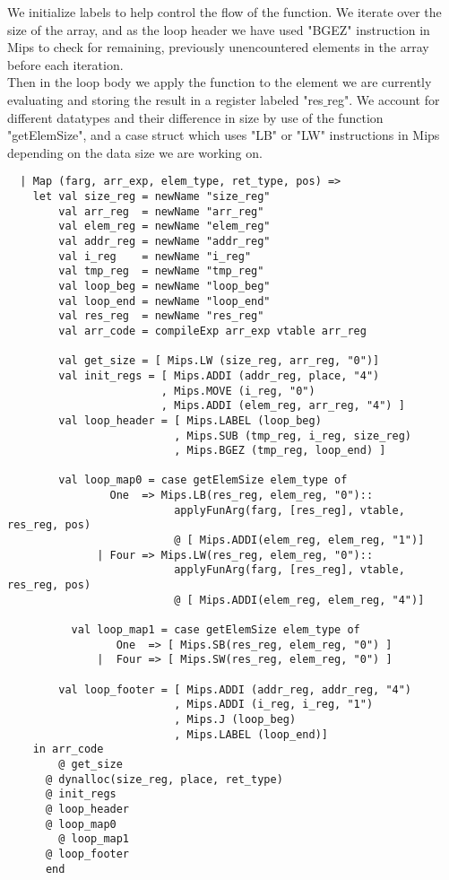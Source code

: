 \documentclass[12pt]{article}
\begin{document}
We initialize labels to help control the flow of the function. We iterate over the size of the array, and as the loop header we have used "BGEZ" instruction in Mips to check for remaining, previously unencountered elements in the array before each iteration. \\

Then in the loop body we apply the function to the element we are currently evaluating and storing the result in a register labeled "res\(\_\)reg". We account for different datatypes and their difference in size by use of the function "getElemSize", and a case struct which uses "LB" or "LW" instructions in Mips depending on the data size we are working on.
\begin{verbatim}
  | Map (farg, arr_exp, elem_type, ret_type, pos) =>
    let val size_reg = newName "size_reg"
        val arr_reg  = newName "arr_reg"
        val elem_reg = newName "elem_reg"
        val addr_reg = newName "addr_reg"
        val i_reg    = newName "i_reg"
        val tmp_reg  = newName "tmp_reg"
        val loop_beg = newName "loop_beg"
        val loop_end = newName "loop_end"
        val res_reg  = newName "res_reg"
        val arr_code = compileExp arr_exp vtable arr_reg

        val get_size = [ Mips.LW (size_reg, arr_reg, "0")]
        val init_regs = [ Mips.ADDI (addr_reg, place, "4")
                        , Mips.MOVE (i_reg, "0")
                        , Mips.ADDI (elem_reg, arr_reg, "4") ]
        val loop_header = [ Mips.LABEL (loop_beg)
                          , Mips.SUB (tmp_reg, i_reg, size_reg)
                          , Mips.BGEZ (tmp_reg, loop_end) ]

        val loop_map0 = case getElemSize elem_type of
			    One  => Mips.LB(res_reg, elem_reg, "0")::
				          applyFunArg(farg, [res_reg], vtable, res_reg, pos)
				          @ [ Mips.ADDI(elem_reg, elem_reg, "1")]
			  | Four => Mips.LW(res_reg, elem_reg, "0")::
				          applyFunArg(farg, [res_reg], vtable, res_reg, pos)
				          @ [ Mips.ADDI(elem_reg, elem_reg, "4")]

	      val loop_map1 = case getElemSize elem_type of
			     One  => [ Mips.SB(res_reg, elem_reg, "0") ]
			  |  Four => [ Mips.SW(res_reg, elem_reg, "0") ]

        val loop_footer = [ Mips.ADDI (addr_reg, addr_reg, "4")
                          , Mips.ADDI (i_reg, i_reg, "1")
                          , Mips.J (loop_beg)
                          , Mips.LABEL (loop_end)]
    in arr_code
	    @ get_size
      @ dynalloc(size_reg, place, ret_type)
      @ init_regs
      @ loop_header
      @ loop_map0
	    @ loop_map1
      @ loop_footer
      end



\end{verbatim}
\end{document}
